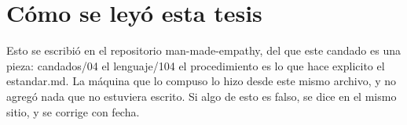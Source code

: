 \documentclass[11pt,a4paper]{article}
\begin{document}
\section*{Cómo se leyó esta tesis}
Esto se escribió en el repositorio man-made-empathy, del que este candado es una pieza: candados/04 el lenguaje/104 el procedimiento es lo que hace explicito el estandar.md. La máquina que lo compuso lo hizo desde este mismo archivo, y no agregó nada que no estuviera escrito. Si algo de esto es falso, se dice en el mismo sitio, y se corrige con fecha.
\end{document}
